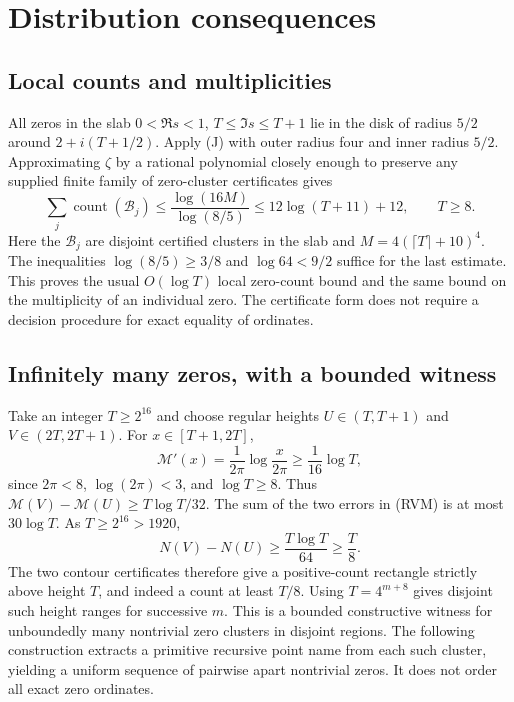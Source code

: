 \section{Distribution consequences}
\label{sec:consequences}

\subsection{Local counts and multiplicities}

All zeros in the slab $0<\Re s<1$, $T\le\Im s\le T+1$ lie in the disk
of radius $5/2$ around $2+i(T+1/2)$.  Apply (J) with outer radius four and
inner radius $5/2$.  Approximating $\zeta$ by a rational polynomial closely
enough to preserve any supplied finite family of zero-cluster certificates
gives
\[
 \sum_j \operatorname{count}(\mathcal B_j)
 \le\frac{\log(16M)}{\log(8/5)}
 \le12\log(T+11)+12,\qquad T\ge8.                       \tag{LC}
\]
Here the $\mathcal B_j$ are disjoint certified clusters in the slab and
$M=4(\lceil T\rceil+10)^4$.
The inequalities $\log(8/5)\ge3/8$ and $\log64<9/2$ suffice for the last
estimate.  This proves the usual $O(\log T)$ local zero-count bound and the
same bound on the multiplicity of an individual zero.  The certificate
form does not require a decision procedure for exact equality of ordinates.

\subsection{Infinitely many zeros, with a bounded witness}

Take an integer $T\ge2^{16}$ and choose regular heights
$U\in(T,T+1)$ and $V\in(2T,2T+1)$.  For $x\in[T+1,2T]$,
\[
 \mathcal M'(x)=\frac1{2\pi}\log\frac{x}{2\pi}
       \ge\frac1{16}\log T,
\]
since $2\pi<8$, $\log(2\pi)<3$, and $\log T\ge8$.
Thus $\mathcal M(V)-\mathcal M(U)\ge T\log T/32$.
The sum of the two errors in (RVM) is at most $30\log T$.
As $T\ge2^{16}>1920$,
\[
 N(V)-N(U)\ge\frac{T\log T}{64}\ge\frac T8.            \tag{AB}
\]
The two contour certificates therefore give a positive-count rectangle
strictly above height $T$, and indeed a count at least $T/8$.
Using $T=4^{m+8}$ gives disjoint such height ranges for successive $m$.
This is a bounded constructive witness for unboundedly many nontrivial
zero clusters in disjoint regions. The following construction extracts
a primitive recursive point name from each such cluster, yielding
a uniform sequence of pairwise apart nontrivial zeros. It does not
order all exact zero ordinates.

